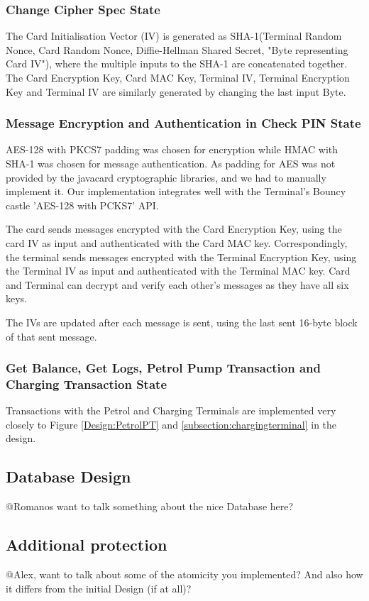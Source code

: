 \documentclass[a4paper,10pt]{llncs}
\begin{document}
\subsubsection{Change Cipher Spec State}
The Card Initialisation Vector (IV) is generated as SHA-1(Terminal Random Nonce, Card Random Nonce, Diffie-Hellman Shared Secret, "Byte representing Card IV"), where the multiple inputs to the SHA-1 are concatenated together. The Card Encryption Key, Card MAC Key, Terminal IV, Terminal Encryption Key and Terminal IV are similarly generated by changing the last input Byte. 

\subsubsection{Message Encryption and Authentication in Check PIN State}
AES-128 with PKCS7 padding was chosen for encryption while HMAC with SHA-1 was chosen for message authentication. As padding for AES was not provided by the javacard cryptographic libraries, and we had to manually implement it. Our implementation integrates well with the Terminal's Bouncy castle 'AES-128 with PCKS7' API.

The card sends messages encrypted with the Card Encryption Key, using the card IV as input and authenticated with the Card MAC key. Correspondingly, the terminal sends messages encrypted with the Terminal Encryption Key, using the Terminal IV as input and authenticated with the Terminal MAC key. Card and Terminal can decrypt and verify each other's messages as they have all six keys.

The IVs are updated after each message is sent, using the last sent 16-byte block of that sent message.

\subsubsection{Get Balance, Get Logs, Petrol Pump Transaction and Charging Transaction State}
Transactions with the Petrol and Charging Terminals are implemented very closely to Figure \ref{Design:PetrolPT} and \ref{subsection:chargingterminal} in the design. 


\subsection{Database Design}

@Romanos want to talk something about the nice Database here?

\subsection{Additional protection}
@Alex, want to talk about some of the atomicity you implemented? And also how it differs from the initial Design (if at all)?
\end{document}
